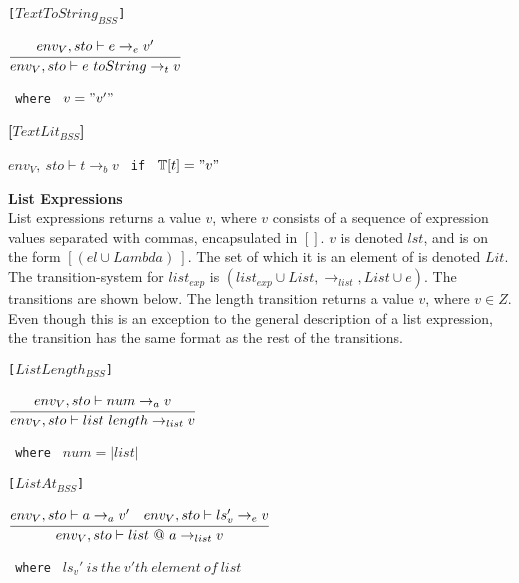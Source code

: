 \texttt{[$TextToString_{BSS}$]}\\
\begin{center}
	\begin{math}
		\cfrac
			{env_V, sto \vdash e \rightarrow_{e} v'}
			{env_V, sto \vdash e\ toString \rightarrow_{t} v}
	\end{math}
	
	\texttt{ where } $v = "v'"$
\end{center}

\textbf{[$TextLit_{BSS}$]}\\
\begin{center}
	\begin{math}
	env_V,\ sto \vdash t \rightarrow_b v
	\end{math}
	\texttt{ if } $\mathbb{T}[t] = "v"$
\end{center}

\textbf{\Large{List Expressions}}\\
List expressions returns a value $v$, where $v$ consists of a sequence of expression values separated with commas, encapsulated in $[]$.
$v$ is denoted $lst$, and is on the form $[(el \cup Lambda)~]$.
The set of which it is an element of is denoted $Lit$.
The transition-system for $list_{exp}$ is $(list_{exp} \cup List, \rightarrow_{list}, List \cup e)$.
The transitions are shown below.
The length transition returns a value $v$, where $v \in Z$.
Even though this is an exception to the general description of a list expression, the transition has the same format as the rest of the transitions.

\texttt{[$ListLength_{BSS}$]}\\
\begin{center}
	\begin{math}
		\cfrac
			{env_V, sto \vdash num \rightarrow_{a} v}
			{env_V, sto \vdash list\ length \rightarrow_{list} v}
	\end{math}
	
	\texttt{ where } $num = |list|$
\end{center}

\texttt{[$ListAt_{BSS}$]}\\
\begin{center}
	\begin{math}
		\cfrac
			{env_V, sto \vdash a \rightarrow_{a} v' \quad env_V, sto \vdash ls_v' \rightarrow_e v}
			{env_V, sto \vdash list\ @\ a \rightarrow_{list} v}
	\end{math}
	
	\texttt{ where } $ls_v'\ is\ the\ v'th\ element\ of\ list$
\end{center}

